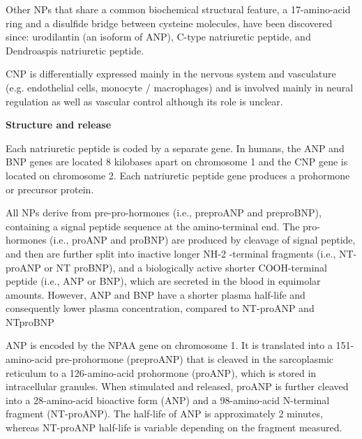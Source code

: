 \documentclass[14pt,a4paper,onecolumn]{extarticle}
\begin{document}
Other NPs that share a common biochemical structural feature, a 17-amino-acid ring and a disulfide bridge between cysteine molecules, have been discovered since: urodilantin (an isoform of ANP), C-type natriuretic peptide, and Dendroaspis natriuretic peptide. \citep{Gaggin2014} %

CNP is differentially expressed mainly in the nervous system and vasculature (e.g. endothelial cells, monocyte / macrophages) and is involved mainly in neural regulation as well as vascular control although its role is unclear. \citep{Suzuki2001} %


\textbf{Structure and release}

Each natriuretic peptide is coded by a separate gene. In humans, the ANP and BNP genes are located 8 kilobases apart on chromosome 1 and the CNP gene is located on chromosome 2. Each natriuretic peptide gene produces a prohormone or precursor protein. \citep{Suzuki2001} %

All NPs derive from pre-pro-hormones (i.e., preproANP and preproBNP), containing a signal peptide sequence at the amino-terminal end. The pro-hormones (i.e., proANP and proBNP) are produced by cleavage of signal peptide, and then are further split into inactive longer NH-2 -terminal fragments (i.e., NT-proANP or NT proBNP), and a biologically active shorter COOH-terminal peptide (i.e., ANP or BNP), which are secreted in the blood in equimolar amounts. However, ANP and BNP have a shorter plasma half-life and consequently lower plasma concentration, compared to NT-proANP and NTproBNP \citep{bib35}

ANP is encoded by the NPAA gene on chromosome 1. It is translated into a 151-amino-acid pre-prohormone (preproANP) that is cleaved in the sarcoplasmic reticulum to a 126-amino-acid prohormone (proANP), which is stored in intracellular granules.  When stimulated and released, proANP is further cleaved into a 28-amino-acid bioactive form (ANP) and a 98-amino-acid N-terminal fragment (NT-proANP). The half-life of ANP is approximately 2 minutes, whereas NT-proANP half-life is variable depending on the fragment measured. \citep{Volpe2016} %
\end{document}
